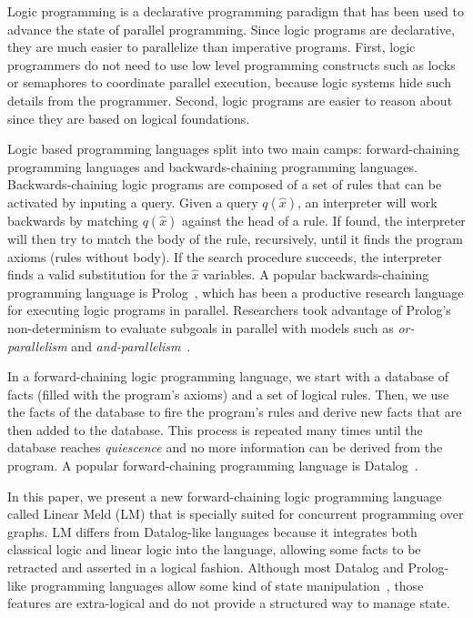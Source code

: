 Logic programming is a declarative programming paradigm that has been used to advance the state of parallel programming.
Since logic programs are declarative, they are much easier to parallelize than imperative programs. First, logic programmers do not
need to use low level programming constructs such as locks or semaphores to coordinate parallel execution, because logic
systems hide such details from the programmer. Second, logic programs are easier to reason about since they are based on logical
foundations.

Logic based programming languages split into two main camps: forward-chaining programming languages and backwards-chaining 
programming languages. Backwards-chaining logic programs are composed of a set of rules that can be activated by inputing a query. Given a query $q(\hat{x})$, an interpreter will work backwards by matching $q(\hat{x})$ against the head of a rule. If found, the interpreter will then try to match the body of the rule, recursively, until it finds the program axioms (rules without body). If the search procedure succeeds, the interpreter finds a valid substitution for the $\hat{x}$ variables. A popular backwards-chaining programming
language is Prolog~\cite{Colmerauer:1993:BP:154766.155362}, which has been a productive research language for executing logic
programs in parallel. Researchers took advantage of Prolog's non-determinism to evaluate subgoals
in parallel with models such as \emph{or-parallelism} and \emph{and-parallelism}~\cite{Gupta:2001:PEP:504083.504085}.

In a forward-chaining logic programming language, we start with a database of facts (filled with the program's
axioms) and a set of logical rules. Then, we use the facts of the database to fire the program's rules and derive new facts that are
then added to the database. This process is repeated many times until the database reaches \emph{quiescence} and no more information can
be derived from the program.
A popular forward-chaining programming language is Datalog~\cite{Ramakrishnan93asurvey}.

In this paper, we present a new forward-chaining logic programming language called Linear Meld (LM) that is specially suited
for concurrent programming over graphs. LM differs from Datalog-like languages because it integrates both classical
logic and linear logic into the language, allowing some facts to be retracted and asserted in a logical fashion. Although most
Datalog and Prolog-like programming languages allow some kind of state manipulation~\cite{Liu98extendingdatalog}, those features
are extra-logical and do not provide a structured way to manage state.

